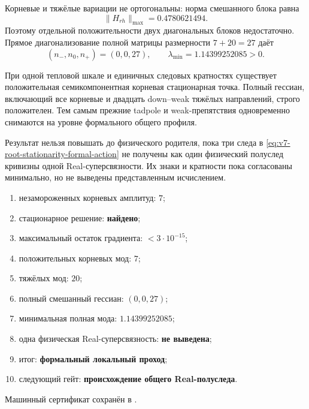 Корневые и тяжёлые вариации не ортогональны: норма смешанного блока равна
\begin{equation}
 \|H_{r h}\|_{\max}=0.4780621494.
 \label{eq:v7-root-stationarity-cross-block}
\end{equation}
Поэтому отдельной положительности двух диагональных блоков недостаточно.
Прямое диагонализование полной матрицы размерности $7+20=27$ даёт
\begin{equation}
 (n_-,n_0,n_+)=(0,0,27),\qquad
 \lambda_{\min}=1.14399252085>0.
 \label{eq:v7-root-stationarity-full-signature}
\end{equation}

\begin{theorem}
При одной тепловой шкале и единичных следовых кратностях существует
положительная семикомпонентная корневая стационарная точка. Полный гессиан,
включающий все корневые и двадцать down--weak тяжёлых направлений, строго
положителен. Тем самым прежние tadpole и weak-препятствия одновременно
снимаются на уровне формального общего профиля.
\end{theorem}

\begin{nogocriterion}
Результат нельзя повышать до физического родителя, пока три следа в
\eqref{eq:v7-root-stationarity-formal-action} не получены как один
физический полуслед кривизны одной Real-суперсвязности. Их знаки и
кратности пока согласованы минимально, но не выведены представленным
исчислением.
\end{nogocriterion}

\begin{protocol}
\begin{enumerate}
 \item незамороженных корневых амплитуд: \textbf{$7$};
 \item стационарное решение: \textbf{найдено};
 \item максимальный остаток градиента: \textbf{$<3\cdot10^{-15}$};
 \item положительных корневых мод: \textbf{$7$};
 \item тяжёлых мод: \textbf{$20$};
 \item полный смешанный гессиан: \textbf{$(0,0,27)$};
 \item минимальная полная мода: \textbf{$1.14399252085$};
 \item одна физическая Real-суперсвязность: \textbf{не выведена};
 \item итог: \textbf{формальный локальный проход};
 \item следующий гейт: \textbf{происхождение общего Real-полуследа}.
\end{enumerate}
\end{protocol}

Машинный сертификат сохранён в
.
